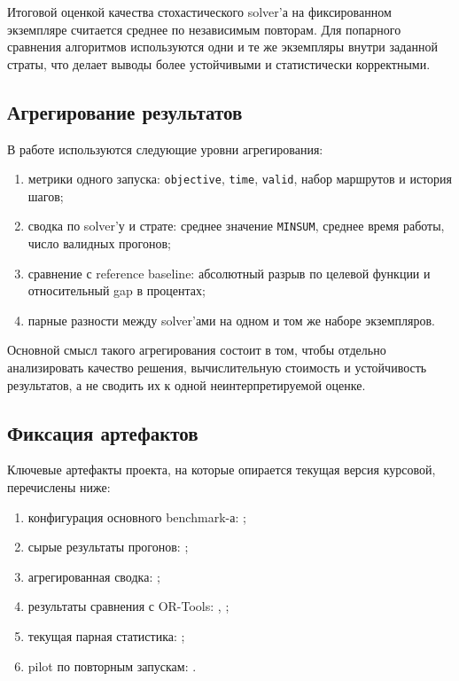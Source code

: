 \documentclass[a4paper,12pt]{article}
\begin{document}
Итоговой оценкой качества стохастического solver'а на фиксированном экземпляре считается среднее по независимым повторам. Для попарного сравнения алгоритмов используются одни и те же экземпляры внутри заданной страты, что делает выводы более устойчивыми и статистически корректными.

\subsection{Агрегирование результатов}

В работе используются следующие уровни агрегирования:
\begin{enumerate}[label=\arabic*.]
  \item метрики одного запуска: \texttt{objective}, \texttt{time}, \texttt{valid}, набор маршрутов и история шагов;
  \item сводка по solver'у и страте: среднее значение \texttt{MINSUM}, среднее время работы, число валидных прогонов;
  \item сравнение с reference baseline: абсолютный разрыв по целевой функции и относительный gap в процентах;
  \item парные разности между solver'ами на одном и том же наборе экземпляров.
\end{enumerate}

Основной смысл такого агрегирования состоит в том, чтобы отдельно анализировать качество решения, вычислительную стоимость и устойчивость результатов, а не сводить их к одной неинтерпретируемой оценке.

\subsection{Фиксация артефактов}

Ключевые артефакты проекта, на которые опирается текущая версия курсовой, перечислены ниже:
\begin{enumerate}[label=\arabic*.]
  \item конфигурация основного benchmark-а: ;
  \item сырые результаты прогонов: ;
  \item агрегированная сводка: ;
  \item результаты сравнения с OR-Tools: , ;
  \item текущая парная статистика: ;
  \item pilot по повторным запускам: .
\end{enumerate}
\end{document}
